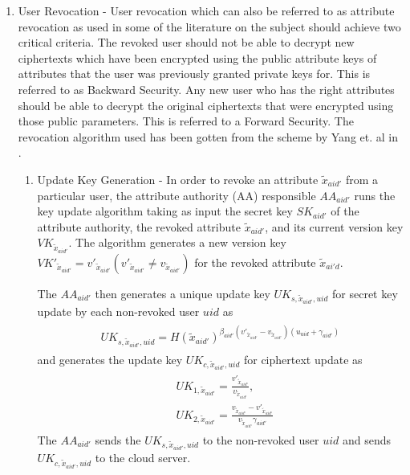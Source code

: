 \begin{enumerate}
	\item User Revocation - User revocation which can also be referred to as attribute revocation as used in some of the literature on the subject should achieve two critical criteria. The revoked user should not be able to decrypt new ciphertexts which have been encrypted using the public attribute keys of attributes that the user was previously granted private keys for. This is referred to as Backward Security. Any new user who has the right attributes should be able to decrypt the original ciphertexts that were encrypted using those public parameters. This is referred to a Forward Security. The revocation algorithm used has been gotten from the scheme by Yang et. al in \cite{Yang2014}.
	
	
	\begin{enumerate}
		\item Update Key Generation - In order to revoke an attribute $\tilde{x}_{aid'}$ from a particular user, the attribute authority (AA) responsible $AA_{aid'}$ runs the key update algorithm taking as input the secret key $SK_{aid'}$ of the 
		attribute authority, the revoked attribute $\tilde{x}_{aid'}$, and its current version key $VK_{\tilde{x}_{aid'}}$.
		The algorithm generates a new version key $VK'_{\tilde{x}_{aid'}} = v'_{\tilde{x}_{aid'}} (v'_{\tilde{x}_{aid'}} \neq v_{\tilde{x}_{aid'}})$ for the revoked attribute $\tilde{x}_{ai'd}$.
		
		The $AA_{aid'}$ then generates a unique update key ${UK}_{s,\tilde{x}_{aid'},uid}$ for secret key update by each non-revoked user $uid$ as
		\begin{align}
		\begin{split}
		{UK}_{s,\tilde{x}_{aid'},uid} = H(\tilde{x}_{aid'})^{\beta_{aid'}(v'_{\tilde{x}_{aid'}}-v_{\tilde{x}_{aid'}})(u_{uid}+\gamma_{aid'})}
		\end{split}
		\end{align}
		and generates the update key ${UK}_{c,\tilde{x}_{aid'},uid}$ for ciphertext update as
		\begin{align}
		\begin{split}
		&UK_{1,\tilde{x}_{aid'}} = \frac{v'_{\tilde{x}_{aid'}}}{v_{\tilde{x}_{aid'}}}, \\ &UK_{2,\tilde{x}_{aid'}} = \frac{v_{\tilde{x}_{aid'}} - v'_{\tilde{x}_{aid'}}}{v_{\tilde{x}_{aid'}}\gamma_{aid'}}
		\end{split}
		\end{align}
		The $AA_{aid'}$ sends the ${UK}_{s,\tilde{x}_{aid'},uid}$ to the non-revoked user $uid$ and sends ${UK}_{c,\tilde{x}_{aid'},uid}$ to the cloud server.
		

\end{enumerate}
\end{enumerate}
